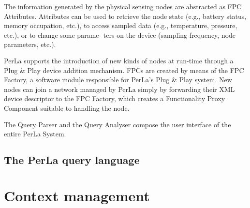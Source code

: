 The information generated by the physical sensing nodes are abstracted as FPC
Attributes. Attributes can be used to retrieve the node state (e.g., battery
status, memory occupation, etc.), to access sampled data (e.g., temperature,
pressure, etc.), or to change some parame- ters on the device (sampling
frequency, node parameters, etc.). 

PerLa supports the introduction of new
kinds of nodes at run-time through a Plug \& Play device addition mechanism.
FPCs are created by means of the FPC Factory, a software module responsible for
PerLa’s Plug \& Play system. New nodes can join a network managed by PerLa
simply by forwarding their XML device descriptor to the FPC Factory, which
creates a Functionality Proxy Component suitable to handling the node.

The Query Parser and the Query Analyser compose the user interface of the
entire PerLa System.

\subsection{The PerLa query language}

\section{Context management}

